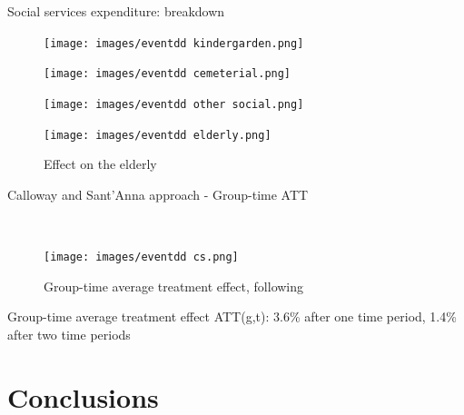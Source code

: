 \documentclass[xcolor={dvipsnames}]{beamer}
\begin{document}
\begin{frame}{Social services expenditure: breakdown}

\vspace{-20}
\begin{figure}[H]
\begin{minipage}[t]{.5\linewidth}
   \centering
    \caption{Effect on kindergarden}
    \texttt{[image: images/eventdd kindergarden.png]}
    \vspace{-10}
    \caption{Effect on cemeterial services}
    \texttt{[image: images/eventdd cemeterial.png]}
\end{minipage}\hfill
\begin{minipage}[t]{.5\linewidth}
    \centering
    \caption{Effect on other social activities}
    \texttt{[image: images/eventdd other social.png]}
    \vspace{-10}
    \caption{Effect on the elderly}
    \texttt{[image: images/eventdd elderly.png]}
\end{minipage}
\end{figure}


\end{frame}

\begin{frame}{Calloway and Sant'Anna approach - Group-time ATT}

\begin{minipage}[ht]{.5\linewidth} \\ 

\begin{figure}
    \centering
    \texttt{[image: images/eventdd cs.png]}
    \caption{Group-time average treatment effect, following \cite{callaway2021}}
\end{figure}
\end{minipage}\hfill
\begin{minipage}[ht]{.3\linewidth}
\justifying
\fontsize{8}{7.2}\selectfont 
\vspace{50}
    Group-time average treatment effect ATT(g,t): 3.6\% after one time period, 1.4\% after two time periods
\end{minipage}
    
\end{frame}


\section{Conclusions}
\end{document}
